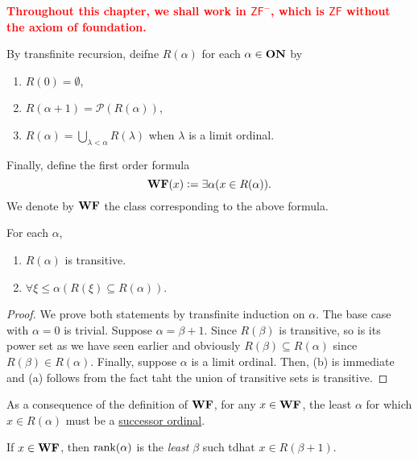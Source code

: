 \textbf{\textcolor{red}{Throughout this chapter, we shall work in $\mathsf{ZF}^-$, which is $\mathsf{ZF}$ without the axiom of foundation.}}
\begin{definition}
    By transfinite recursion, deifne $R(\alpha)$ for each $\alpha\in\mathbf{ON}$ by 
    \begin{enumerate}[label=(\alph*)]
        \item $R(0) = \emptyset$, 
        \item $R(\alpha + 1) = \mathscr P(R(\alpha))$, 
        \item $R(\alpha) = \bigcup_{\lambda < \alpha} R(\lambda)$ when $\lambda$ is a limit ordinal.
    \end{enumerate}
    Finally, define the first order formula 
    \begin{equation*}
        \mathbf{WF}(x) := \exists\alpha(x\in R(\alpha)).
    \end{equation*}
    We denote by $\mathbf{WF}$ the class corresponding to the above formula.
\end{definition}

\begin{lemma}
    For each $\alpha$, 
    \begin{enumerate}
        \item $R(\alpha)$ is transitive. 
        \item $\forall\xi\le\alpha(R(\xi)\subseteq R(\alpha))$.
    \end{enumerate}
\end{lemma}
\begin{proof}
    We prove both statements by transfinite induction on $\alpha$. The base case with $\alpha = 0$ is trivial. Suppose $\alpha = \beta + 1$. Since $R(\beta)$ is transitive, so is its power set as we have seen earlier and obviously $R(\beta)\subseteq R(\alpha)$ since $R(\beta)\in R(\alpha)$. Finally, suppose $\alpha$ is a limit ordinal. Then, (b) is immediate and (a) follows from the fact taht the union of transitive sets is transitive.
\end{proof}

\begin{remark}
    As a consequence of the definition of $\mathbf{WF}$, for any $x\in\mathbf{WF}$, the least $\alpha$ for which $x\in R(\alpha)$ must be a \ul{successor ordinal}.
\end{remark}

\begin{definition}
    If $x\in\mathbf{WF}$, then $\operatorname{rank}(\alpha)$ is the \emph{least} $\beta$ such tdhat $x\in R(\beta + 1)$.
\end{definition}

